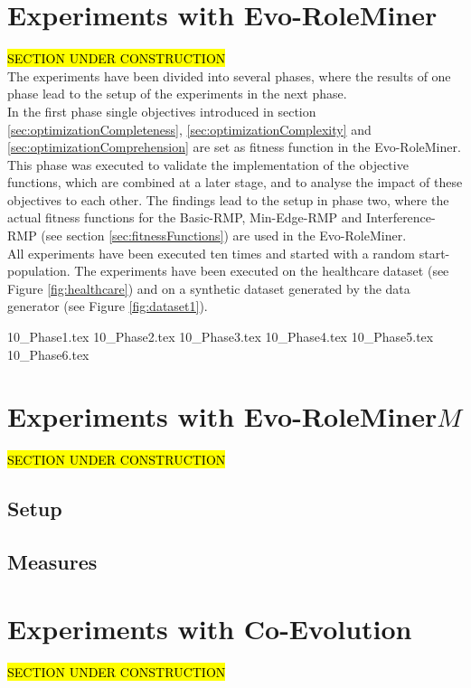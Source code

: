\newpage
\section{Experiments with Evo-RoleMiner}
\hl{SECTION UNDER CONSTRUCTION}\\
The experiments have been divided into several phases, where the results of one phase lead to the setup of the experiments in the next phase.\\
In the first phase single objectives introduced in section \ref{sec:optimizationCompleteness}, \ref{sec:optimizationComplexity} and \ref{sec:optimizationComprehension} are set as fitness function in the Evo-RoleMiner. This phase was executed to validate the implementation of the objective functions, which are combined at a later stage, and to analyse the impact of these objectives to each other. The findings lead to the setup in phase two, where the actual fitness functions for the Basic-RMP, Min-Edge-RMP and Interference-RMP (see section \ref{sec:fitnessFunctions}) are used in the Evo-RoleMiner.\\
All experiments have been executed ten times and started with a random start-population. The experiments have been executed on the healthcare dataset (see Figure \ref{fig:healthcare}) and on a synthetic dataset generated by the data generator (see Figure \ref{fig:dataset1}).

{10_Phase1.tex}
{10_Phase2.tex}
{10_Phase3.tex}
{10_Phase4.tex}
{10_Phase5.tex}
{10_Phase6.tex}

\section{Experiments with Evo-RoleMiner$M$}
\hl{SECTION UNDER CONSTRUCTION}\\
\subsection{Setup}
\subsection{Measures}

\section{Experiments with Co-Evolution}
\hl{SECTION UNDER CONSTRUCTION}\\

